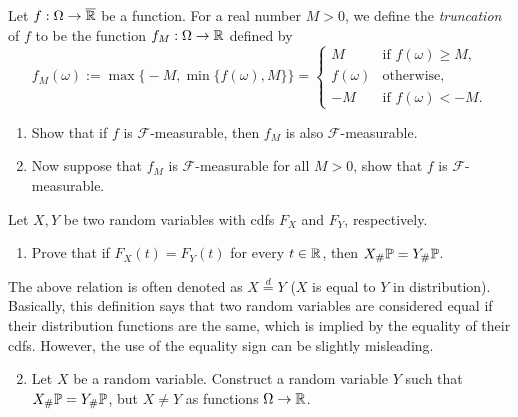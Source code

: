 \begin{problem}[Truncation]
	Let $f:\Omega\to\overline{\mathbb R}$ be a function. For a real number $M>0$, we define the \emph{truncation} of $f$ to be the function $f_M:\Omega\to \mathbb R$ defined by
	\[
		f_M(\omega) := \max\bigl\{ -M, \min\bigl\{ f(\omega),M\bigr\}\bigr\} = \begin{cases}
			M & \text{if $f(\omega)\ge M$,} \\
			f(\omega) & \text{otherwise}, \\
			-M & \text{if $f(\omega)< -M$.}
		\end{cases}
	\]
	\begin{enumerate}[label=(\alph*)]
		\item Show that if $f$ is $\mathcal{F}$-measurable, then $f_M$ is also $\mathcal{F}$-measurable.
		
		\item Now suppose that $f_M$ is $\mathcal{F}$-measurable for all $M>0$, show that $f$ is $\mathcal{F}$-measurable.
	\end{enumerate}
\end{problem}

\begin{problem}
Let $X,Y$ be two random variables with cdfs $F_X$ and $F_Y$, respectively. 
\begin{enumerate}[label=(\alph*)]
\item Prove that if $F_X(t) = F_Y(t)$ for every $t \in \mathbb R$, then $X_\# \mathbb P = Y_\# \mathbb P$. 
\end{enumerate}
The above relation is often denoted as $X \stackrel{d}{=} Y$ ($X$ is equal to $Y$ in distribution). Basically, this definition says that two random variables are considered equal if their distribution functions are the same, which is implied by the equality of their cdfs. However, the use of the equality sign can be slightly misleading.
\begin{enumerate}
\setcounter{enumi}{1}
\item Let $X$ be a random variable. Construct a random variable $Y$ such that $X_\# \mathbb P = Y_\# \mathbb P$, but $X \ne Y$ as functions $\Omega \to \mathbb R$.
\end{enumerate}
\end{problem}

